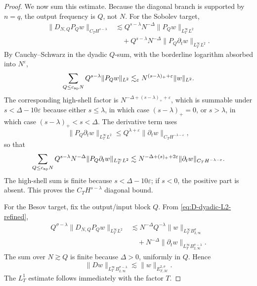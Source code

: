 \documentclass[11pt,reqno]{amsart}
\numberwithin{equation}{section}
\theoremstyle{plain}
\theoremstyle{definition}
\newcommand{\cM}{\mathcal M}
\newcommand{\eps}{\varepsilon}
\begin{document}
\begin{proof}
We now sum this estimate.  Because the diagonal branch is supported by \(n=q\), the output frequency is \(Q\), not \(N\).  For the Sobolev target,
\begin{equation}\label{eq:D-H-weighted}
\begin{aligned}
        \|D_{N,Q}P_Qw\|_{C_TH^{s-\lambda}}
        &\lesssim Q^{s-\lambda}N^{-\Delta}\|P_Qw\|_{L_T^\infty L^2} \\
        &\quad +Q^{s-\lambda}N^{-\Delta}\|P_Q\partial_tw\|_{L_T^\infty L^2}.
\end{aligned}
\end{equation}
By Cauchy--Schwarz in the dyadic \(Q\)-sum, with the borderline logarithm
absorbed into \(N^\eps\),
\begin{equation}\label{eq:D-first-sum}
        \sum_{Q\le c_{\rm ap}N}Q^{s-\lambda}\|P_Qw\|_{L^2}
        \lesssim_\eps N^{(s-\lambda)_++\eps}\|w\|_{L^2}.
\end{equation}
The corresponding high-shell factor is \(N^{-\Delta+(s-\lambda)_++\eps}\), which is summable under \(s<\Delta-10\eps\) because either \(s\le\lambda\), in which case \((s-\lambda)_+=0\), or \(s>\lambda\), in which case \((s-\lambda)_+<s<\Delta\).  The derivative term uses
\begin{equation}\label{eq:D-dt-weighted}
        \|P_Q\partial_tw\|_{L_T^\infty L^2}
        \le Q^{\lambda+\eps}\|\partial_tw\|_{C_TH^{-\lambda-\eps}},
\end{equation}
so that
\begin{equation}\label{eq:D-der-sum}
        \sum_{Q\le c_{\rm ap}N}Q^{s-\lambda}N^{-\Delta}
        \|P_Q\partial_tw\|_{L_T^\infty L^2}
        \lesssim N^{-\Delta+(s)_++2\eps}
        \|\partial_tw\|_{C_TH^{-\lambda-\eps}}.
\end{equation}
The high-shell sum is finite because \(s<\Delta-10\eps\); if \(s<0\), the positive part is absent.  This proves the \(C_TH^{s-\lambda}\) diagonal bound.

For the Besov target, fix the output/input block \(Q\).  From \eqref{eq:D-dyadic-L2-refined},
\begin{equation}\label{eq:D-Besov-refined}
\begin{aligned}
        Q^{\sigma-\lambda}\|D_{N,Q}P_Qw\|_{L_T^\infty L^2}
        &\lesssim N^{-\Delta}Q^{-\lambda}
        \|w\|_{L_T^\infty B^\sigma_{2,\infty}} \\
        &\quad +N^{-\Delta}
        \|\partial_tw\|_{L_T^\infty B^{\sigma-\lambda}_{2,\infty}}.
\end{aligned}
\end{equation}
The sum over \(N\gtrsim Q\) is finite because \(\Delta>0\), uniformly in \(Q\).  Hence
\[
        \|D w\|_{L_T^\infty B^{\sigma-\lambda}_{2,\infty}}
        \lesssim \|w\|_{E_{T,\cM}^{2,\sigma}}.
\]
The \(L_T^1\) estimate follows immediately with the factor \(T\).


\end{proof}
\end{document}
